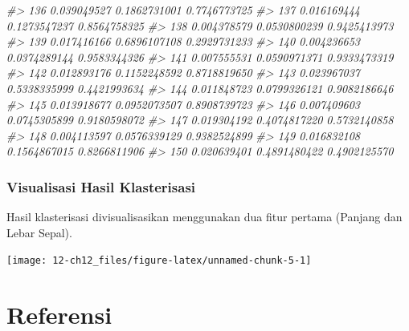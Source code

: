 \documentclass[
  oneside]{book}
\newenvironment{Shaded}{\begin{snugshade}}{\end{snugshade}}
\newcommand{\AttributeTok}[1]{\textcolor[rgb]{0.13,0.29,0.53}{#1}}
\newcommand{\CommentTok}[1]{\textcolor[rgb]{0.56,0.35,0.01}{\textit{#1}}}
\newcommand{\ConstantTok}[1]{\textcolor[rgb]{0.56,0.35,0.01}{#1}}
\newcommand{\FunctionTok}[1]{\textcolor[rgb]{0.13,0.29,0.53}{\textbf{#1}}}
\newcommand{\NormalTok}[1]{#1}
\newcommand{\SpecialCharTok}[1]{\textcolor[rgb]{0.81,0.36,0.00}{\textbf{#1}}}
\newcommand{\StringTok}[1]{\textcolor[rgb]{0.31,0.60,0.02}{#1}}
\begin{document}
\begin{Shaded}
\begin{Highlighting}[]
\CommentTok{\#\textgreater{} 136 0.039049527 0.1862731001 0.7746773725}
\CommentTok{\#\textgreater{} 137 0.016169444 0.1273547237 0.8564758325}
\CommentTok{\#\textgreater{} 138 0.004378579 0.0530800239 0.9425413973}
\CommentTok{\#\textgreater{} 139 0.017416166 0.6896107108 0.2929731233}
\CommentTok{\#\textgreater{} 140 0.004236653 0.0374289144 0.9583344326}
\CommentTok{\#\textgreater{} 141 0.007555531 0.0590971371 0.9333473319}
\CommentTok{\#\textgreater{} 142 0.012893176 0.1152248592 0.8718819650}
\CommentTok{\#\textgreater{} 143 0.023967037 0.5338335999 0.4421993634}
\CommentTok{\#\textgreater{} 144 0.011848723 0.0799326121 0.9082186646}
\CommentTok{\#\textgreater{} 145 0.013918677 0.0952073507 0.8908739723}
\CommentTok{\#\textgreater{} 146 0.007409603 0.0745305899 0.9180598072}
\CommentTok{\#\textgreater{} 147 0.019304192 0.4074817220 0.5732140858}
\CommentTok{\#\textgreater{} 148 0.004113597 0.0576339129 0.9382524899}
\CommentTok{\#\textgreater{} 149 0.016832108 0.1564867015 0.8266811906}
\CommentTok{\#\textgreater{} 150 0.020639401 0.4891480422 0.4902125570}
\end{Highlighting}
\end{Shaded}

\subsection*{Visualisasi Hasil Klasterisasi}\label{visualisasi-hasil-klasterisasi}

Hasil klasterisasi divisualisasikan menggunakan dua fitur pertama (Panjang dan Lebar Sepal).

\begin{Shaded}
\end{Shaded}

\begin{center}\texttt{[image: 12-ch12\_files/figure-latex/unnamed-chunk-5-1]} \end{center}

\chapter*{Referensi}\label{References}

  
\end{document}
